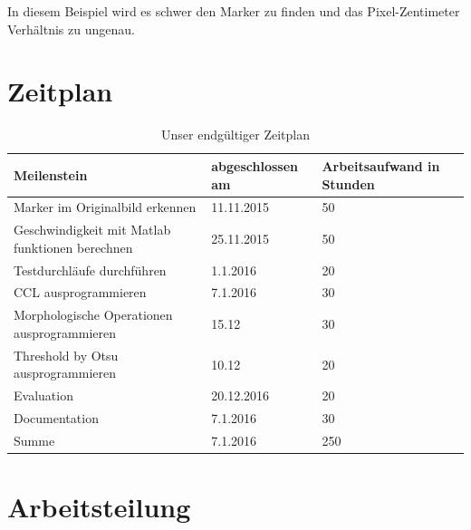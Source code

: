 \documentclass[deutsch]{scrartcl}
\begin{document}
In diesem Beispiel wird es schwer den Marker zu finden und das Pixel-Zentimeter Verhältnis zu ungenau.

\section{Zeitplan}

\begin{center}
	\begin{table}[htb]
		\begin{tabularx}{\textwidth}{ |X|X|X| }
			\hline
			Meilenstein & abgeschlossen am & Arbeitsaufwand in Stunden\\
			\hline		
			Marker im Originalbild erkennen & 11.11.2015 &	50 \\
			\hline
			Geschwindigkeit mit Matlab funktionen berechnen & 25.11.2015 & 50\\ 
			\hline
			Testdurchläufe durchführen & 1.1.2016 & 20 \\
			\hline
			CCL ausprogrammieren & 7.1.2016 & 30\\
			\hline		
			Morphologische Operationen ausprogrammieren & 15.12 & 30 \\
			\hline
			Threshold by Otsu ausprogrammieren & 10.12 & 20 \\
			\hline
			Evaluation & 20.12.2016 & 20 \\
			\hline
			Documentation & 7.1.2016 & 30 \\
			\hline
			\hline
			Summe & 7.1.2016 & 250 \\
			\hline
		\end{tabularx}	
		\caption{Unser endgültiger Zeitplan}
		\label{table:zeitplan}
	\end{table}
\end{center}


\section{Arbeitsteilung}
\end{document}
